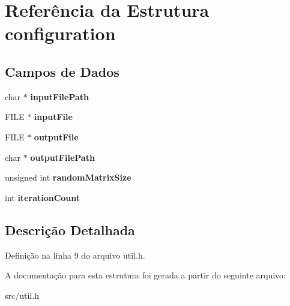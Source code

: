 \hypertarget{structconfiguration}{}\section{Referência da Estrutura configuration}
\label{structconfiguration}
\subsection*{Campos de Dados}
\begin{DoxyCompactItemize}
\item 
\mbox{\label{structconfiguration_a1463d7d8eb58df5d4fc36d2631a07095}} 
char $\ast$ {\bfseries input\+File\+Path}
\item 
\mbox{\label{structconfiguration_a96f3fef18c7c759608873188ff6e7311}} 
F\+I\+LE $\ast$ {\bfseries input\+File}
\item 
\mbox{\label{structconfiguration_a41e1c4a03bad8cb560be395f253dd503}} 
F\+I\+LE $\ast$ {\bfseries output\+File}
\item 
\mbox{\label{structconfiguration_a58032d6cb9cfd6dcb352a5b6915533f6}} 
char $\ast$ {\bfseries output\+File\+Path}
\item 
\mbox{\label{structconfiguration_ae3bdb3c4fe40945aa8deb80be9d2c553}} 
unsigned int {\bfseries random\+Matrix\+Size}
\item 
\mbox{\label{structconfiguration_a0504d214c8e8cd2f0db7d17a41a6657d}} 
int {\bfseries iteration\+Count}
\end{DoxyCompactItemize}


\subsection{Descrição Detalhada}


Definição na linha 9 do arquivo util.\+h.



A documentação para esta estrutura foi gerada a partir do seguinte arquivo\+:\begin{DoxyCompactItemize}
\item 
src/util.\+h\end{DoxyCompactItemize}
